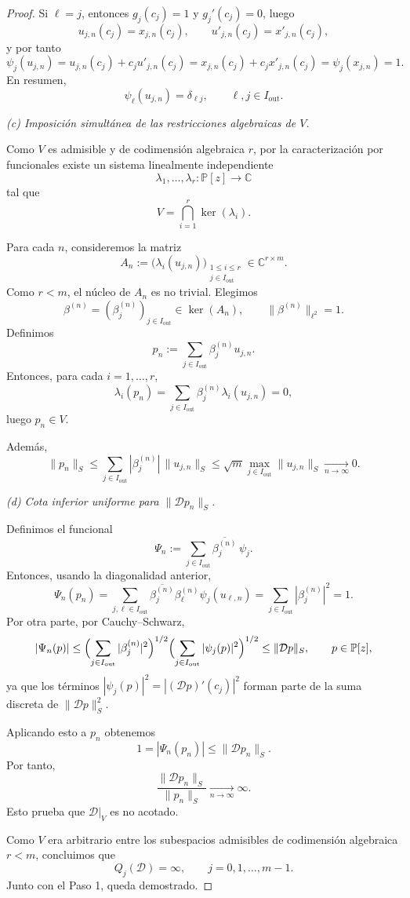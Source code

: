 \documentclass[12pt,a4paper]{article}
\theoremstyle{definition}
\theoremstyle{remark}
\begin{document}
\begin{proof}
	Si $\ell=j$, entonces $g_j(c_j)=1$ y $g_j'(c_j)=0$, luego
	\[
		u_{j,n}(c_j)=x_{j,n}(c_j),
		\qquad
		u'_{j,n}(c_j)=x'_{j,n}(c_j),
	\]
	y por tanto
	\[
		\psi_j(u_{j,n})
		=
		u_{j,n}(c_j)+c_j u'_{j,n}(c_j)
		=
		x_{j,n}(c_j)+c_jx'_{j,n}(c_j)
		=
		\psi_j(x_{j,n})=1.
	\]
	En resumen,
	\[
		\psi_\ell(u_{j,n})=\delta_{\ell j},
		\qquad \ell,j\in I_{\mathrm{out}}.
	\]

	\smallskip
	\noindent
	\emph{(c) Imposición simultánea de las restricciones algebraicas de $V$.}

	Como $V$ es admisible y de codimensión algebraica $r$, por la caracterización por
	funcionales existe un sistema linealmente independiente
	\[
		\lambda_1,\dots,\lambda_r:\mathbb P[z]\to\mathbb C
	\]
	tal que
	\[
		V=\bigcap_{i=1}^r \ker(\lambda_i).
	\]

	Para cada $n$, consideremos la matriz
	\[
		A_n:=\bigl(\lambda_i(u_{j,n})\bigr)_{
		\substack{1\le i\le r\\ j\in I_{\mathrm{out}}}}
		\in \mathbb C^{r\times m}.
	\]
	Como $r<m$, el núcleo de $A_n$ es no trivial. Elegimos
	\[
		\beta^{(n)}=(\beta_j^{(n)})_{j\in I_{\mathrm{out}}}\in \ker(A_n),
		\qquad
		\|\beta^{(n)}\|_{\ell^2}=1.
	\]
	Definimos
	\[
		p_n:=\sum_{j\in I_{\mathrm{out}}}\beta_j^{(n)}u_{j,n}.
	\]
	Entonces, para cada $i=1,\dots,r$,
	\[
		\lambda_i(p_n)=\sum_{j\in I_{\mathrm{out}}}\beta_j^{(n)}\lambda_i(u_{j,n})=0,
	\]
	luego $p_n\in V$.

	Además,
	\[
		\|p_n\|_S
		\le
		\sum_{j\in I_{\mathrm{out}}} |\beta_j^{(n)}|\,\|u_{j,n}\|_S
		\le
		\sqrt m \max_{j\in I_{\mathrm{out}}}\|u_{j,n}\|_S
		\xrightarrow[n\to\infty]{}0.
	\]

	\smallskip
	\noindent
	\emph{(d) Cota inferior uniforme para $\|\mathcal D p_n\|_S$.}

	Definimos el funcional
	\[
		\Psi_n:=\sum_{j\in I_{\mathrm{out}}}\overline{\beta_j^{(n)}}\,\psi_j.
	\]
	Entonces, usando la diagonalidad anterior,
	\[
		\Psi_n(p_n)
		=
		\sum_{j,\ell\in I_{\mathrm{out}}}
		\overline{\beta_j^{(n)}}\beta_\ell^{(n)}\psi_j(u_{\ell,n})
		=
		\sum_{j\in I_{\mathrm{out}}}|\beta_j^{(n)}|^2
		=1.
	\]
	Por otra parte, por Cauchy--Schwarz,
	\[
		|\Psi_n(p)|
		\le
		\Bigl(\sum_{j\in I_{\mathrm{out}}}|\beta_j^{(n)}|^2\Bigr)^{1/2}
		\Bigl(\sum_{j\in I_{\mathrm{out}}}|\psi_j(p)|^2\Bigr)^{1/2}
		\le
		\|\mathcal D p\|_S,
		\qquad p\in\mathbb P[z],
	\]
	ya que los términos $|\psi_j(p)|^2=|(\mathcal D p)'(c_j)|^2$ forman parte de la suma discreta
	de $\|\mathcal D p\|_S^2$.

	Aplicando esto a $p_n$ obtenemos
	\[
		1=|\Psi_n(p_n)|\le \|\mathcal D p_n\|_S.
	\]
	Por tanto,
	\[
		\frac{\|\mathcal D p_n\|_S}{\|p_n\|_S}\xrightarrow[n\to\infty]{}\infty.
	\]
	Esto prueba que $\mathcal D|_V$ es no acotado.

	Como $V$ era arbitrario entre los subespacios admisibles de codimensión algebraica
	$r<m$, concluimos que
	\[
		Q_j(\mathcal D)=\infty,\qquad j=0,1,\dots,m-1.
	\]
	Junto con el Paso 1, queda demostrado.
\end{proof}
\end{document}
